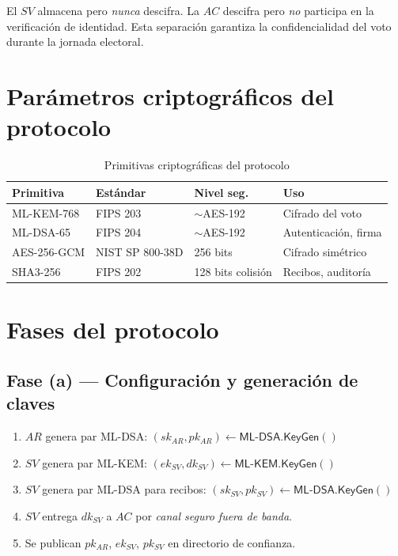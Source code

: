 \documentclass[12pt,a4paper,twoside,openright]{book}
\theoremstyle{plain}
\theoremstyle{definition}
\theoremstyle{remark}
\newcommand{\MLKEM}{\textsf{ML-KEM}}
\newcommand{\MLDSA}{\textsf{ML-DSA}}
\newcommand{\KeyGen}{\mathsf{KeyGen}}
\begin{document}
\begin{minota}
  El $SV$ almacena pero \emph{nunca} descifra. La $AC$ descifra pero
  \emph{no} participa en la verificaci\'on de identidad. Esta separaci\'on
  garantiza la confidencialidad del voto durante la jornada electoral.
\end{minota}

\section{Par\'ametros criptogr\'aficos del protocolo}

\begin{table}[H]
\centering
\caption{Primitivas criptogr\'aficas del protocolo}
\label{tab:primitivas}
\begin{tabular}{llll}
\toprule
\textbf{Primitiva} & \textbf{Est\'andar} & \textbf{Nivel seg.} & \textbf{Uso} \\
\midrule
ML-KEM-768 & FIPS 203 & $\sim$AES-192 & Cifrado del voto \\
ML-DSA-65  & FIPS 204 & $\sim$AES-192 & Autenticaci\'on, firma \\
AES-256-GCM & NIST SP 800-38D & 256 bits & Cifrado sim\'etrico \\
SHA3-256 & FIPS 202 & 128 bits colisi\'on & Recibos, auditor\'ia \\
\bottomrule
\end{tabular}
\end{table}

\section{Fases del protocolo}

\subsection{Fase (a) --- Configuraci\'on y generaci\'on de claves}

\begin{enumerate}
  \item $AR$ genera par ML-DSA:
    $(sk_{AR}, pk_{AR}) \leftarrow \MLDSA.\KeyGen()$
  \item $SV$ genera par ML-KEM:
    $(ek_{SV}, dk_{SV}) \leftarrow \MLKEM.\KeyGen()$
  \item $SV$ genera par ML-DSA para recibos:
    $(sk_{SV}, pk_{SV}) \leftarrow \MLDSA.\KeyGen()$
  \item $SV$ entrega $dk_{SV}$ a $AC$ por \emph{canal seguro fuera de banda}.
  \item Se publican $pk_{AR}$, $ek_{SV}$, $pk_{SV}$ en directorio de confianza.
\end{enumerate}
\end{document}

